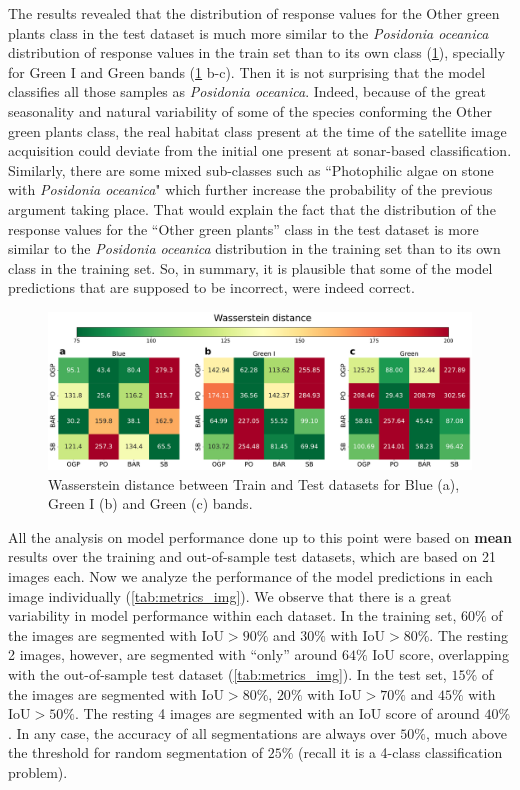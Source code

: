 The results revealed that the distribution of response values for the Other
green plants class in the test dataset is much more similar to the
\textit{Posidonia oceanica} distribution of response values in the train set
than to its own class (\cref{fig:similarity_train_test_classes}), specially for
Green I and Green bands (\cref{fig:similarity_train_test_classes} b-c). Then it
is not surprising that the model classifies all those samples as
\textit{Posidonia oceanica}. Indeed, because of the great seasonality and
natural variability of some of the species conforming the Other green plants
class, the real habitat class present at the time of the satellite image
acquisition could deviate from the initial one present at sonar-based
classification. Similarly, there are some mixed sub-classes
such as ``Photophilic algae on stone with \textit{Posidonia oceanica}" which
further increase the probability of the previous argument taking place. That
would explain the fact that the distribution of the response values for the
``Other green plants'' class in the test dataset is more similar to the
\textit{Posidonia oceanica} distribution in the training set than to its own
class in the training set. So, in summary, it is plausible that some of the
model predictions that are supposed to be incorrect, were indeed correct.

\begin{figure}[H]
    \centering

    \includegraphics[width=\textwidth]{Figures/Wasserstein_distance_by_Classes_&_Datasets.pdf}
    \caption{Wasserstein distance between Train and Test datasets for Blue
        (a), Green I (b) and Green (c) bands.}
    \label{fig:similarity_train_test_classes}
\end{figure}

All the analysis on model performance done up to this point were based on
\textbf{mean} results over the training and out-of-sample test datasets, which
are based on 21 images each. Now we analyze the performance of the model
predictions in each image individually (\cref{tab:metrics_img}). We observe
that there is a great variability in model performance within each dataset. In
the training set, $60\%$ of the images are segmented with IoU$>90\%$ and $30\%$
with IoU$>80\%$. The resting 2 images, however, are segmented with ``only''
around $64\%$ IoU score, overlapping with the out-of-sample test dataset
(\cref{tab:metrics_img}). In the test set, $15\%$ of the images are segmented
with IoU$>80\%$, $20\%$ with IoU$>70\%$ and $45\%$ with IoU$>50\%$. The resting
4 images are segmented with an IoU score of around $40\%$. In any case, the
accuracy of all segmentations are always over $50\%$, much above the threshold
for random segmentation of $25\%$ (recall it is a 4-class classification
problem).

